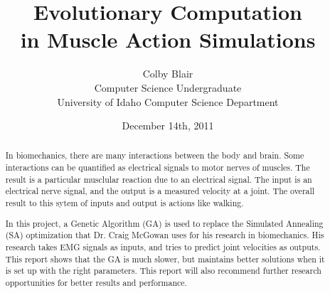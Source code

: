 \documentclass[11pt,letterpaper]{article}
\date{December 14th, 2011}
\title{Evolutionary Computation\\
in Muscle Action Simulations
}
\author{Colby Blair \\
	Computer Science Undergraduate \\
	University of Idaho Computer Science Department
}
\begin{document}
\maketitle

\begin{abstract}
In biomechanics, there are many interactions between the body and brain. Some
interactions can be quantified as electrical signals to motor nerves of muscles.
The result is a particular musclular reaction due to an electrical signal. The
input is an electrical nerve signal, and the output is a measured velocity at
a joint. The overall result to this sytem of inputs and output is actions like 
walking.

In this project, a Genetic Algorithm (GA) is used to replace the Simulated Annealing (SA) optimization
that Dr. Craig McGowan uses for his research in biomechanics. His research takes EMG signals as inputs,
and tries to predict joint velocities as outputs. This report shows that the GA is much slower, but 
maintains better solutions when it is set up with the right parameters. This report will also recommend
further research opportunities for better results and performance.
\end{abstract}

\thispagestyle{empty}


\pagebreak

\thispagestyle{empty}
\tableofcontents
\listoffigures

\pagebreak

\setcounter{page}{1}






%
\end{document}

